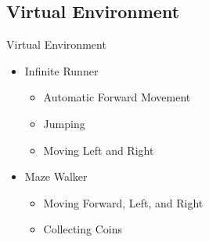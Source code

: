 \subsection*{Virtual Environment}
\begin{frame}{Virtual Environment}
    \begin{itemize}
        \item Infinite Runner
        \begin{itemize}
            \item Automatic Forward Movement
            \item Jumping
            \item Moving Left and Right
        \end{itemize}
        \item Maze Walker
        \begin{itemize}
            \item Moving Forward, Left, and Right
            \item Collecting Coins
        \end{itemize}
    \end{itemize}
\end{frame}

